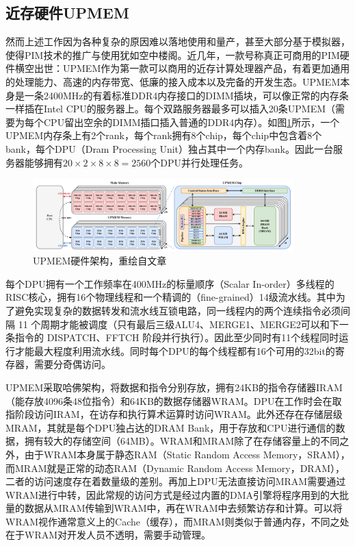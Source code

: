 \subsection{近存硬件UPMEM}
然而上述工作因为各种复杂的原因难以落地使用和量产，甚至大部分基于模拟器，使得PIM技术的推广与使用犹如空中楼阁。近几年，一款号称真正可商用的PIM硬件横空出世：UPMEM作为第一款可以商用的近存计算处理器产品\cite{UPMEMHotChips}，有着更加通用的处理能力、高速的内存带宽、低廉的接入成本以及完备的开发生态。UPMEM本身是一条2400MHz的有着标准DDR4内存接口的DIMM插块，可以像正常的内存条一样插在Intel CPU的服务器上。每个双路服务器最多可以插入20条UPMEM（需要为每个CPU留出空余的DIMM插口插入普通的DDR4内存）。如图\ref{UPMEMArch}所示，一个UPMEM内存条上有2个rank，每个rank拥有8个chip，每个chip中包含着8个bank，每个DPU（Dram Processing Unit）独占其中一个内存bank。因此一台服务器能够拥有$20\times 2\times 8\times 8 = 2560$个DPU并行处理任务。

\begin{figure}[!htbp]
	\centering
    \includegraphics[width=0.9\textwidth]{figures/UPMEMArch.pdf}
    \caption[UPMEM硬件架构]{UPMEM硬件架构，重绘自文章\cite{BenchmarkingMutlu}}
	\label{UPMEMArch}
\end{figure}

每个DPU拥有一个工作频率在400MHz的标量顺序（Scalar In-order）多线程的RISC核心，拥有16个物理线程和一个精调的（fine-grained）14级流水线。其中为了避免实现复杂的数据转发和流水线互锁电路\cite{UPMEMHotChips}，同一线程内的两个连续指令必须间隔 11 个周期才能被调度（只有最后三级ALU4、MERGE1、MERGE2可以和下一条指令的 DISPATCH、FFTCH 阶段并行执行）。因此至少同时有11个线程同时运行才能最大程度利用流水线。同时每个DPU的每个线程都有16个可用的32bit的寄存器，需要分奇偶访问。

UPMEM采取哈佛架构，将数据和指令分别存放，拥有24KB的指令存储器IRAM（能存放4096条48位指令）和64KB的数据存储器WRAM。DPU在工作时会在取指阶段访问IRAM，在访存和执行算术运算时访问WRAM。此外还存在存储层级MRAM，其就是每个DPU独占达的DRAM Bank，用于存放和CPU进行通信的数据，拥有较大的存储空间（64MB）。WRAM和MRAM除了在存储容量上的不同之外，由于WRAM本身属于静态RAM（Static Random Access Memory，SRAM），而MRAM就是正常的动态RAM（Dynamic Random Access Memory，DRAM），二者的访问速度存在着数量级的差别。再加上DPU无法直接访问MRAM需要通过WRAM进行中转，因此常规的访问方式是经过内置的DMA引擎将程序用到的大批量的数据从MRAM传输到WRAM中，再在WRAM中去频繁访存和计算。可以将WRAM视作通常意义上的Cache（缓存），而MRAM则类似于普通内存，不同之处在于WRAM对开发人员不透明，需要手动管理。

